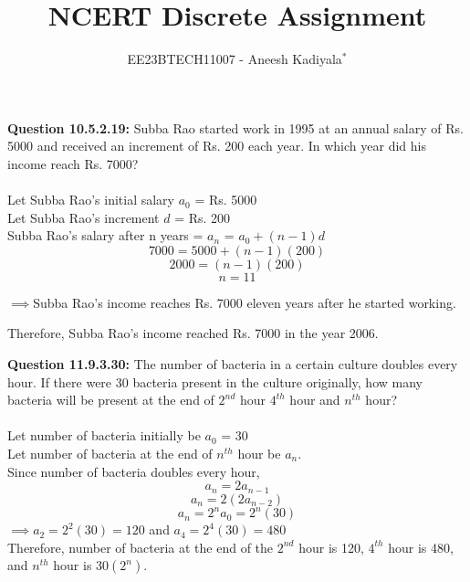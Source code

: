 \documentclass[journal,12pt,twocolumn]{IEEEtran}
\theoremstyle{remark}
\begin{document}

\vspace{3cm}

\title{NCERT Discrete Assignment}
\author{EE23BTECH11007 - Aneesh Kadiyala$^{*}$%
}
\maketitle
\newpage
\bigskip

\renewcommand{\thefigure}{\theenumi}
\renewcommand{\thetable}{\theenumi}

\vspace{3cm}
\textbf{Question 10.5.2.19:} Subba Rao started work in 1995 at an annual salary of Rs. 5000 and received an increment of Rs. 200 each year. In which year did his income reach Rs. 7000?
\\
\solution
\\
Let Subba Rao's initial salary $a_0$ = Rs. 5000
\\
Let Subba Rao's increment $d$ = Rs. 200
\\
Subba Rao's salary after n years = $a_n$ = $a_0 + (n - 1)d$
\\
\[7000 = 5000 + (n - 1)(200)\]
\[2000 = (n - 1)(200)\]
\[n = 11\]

$\implies$Subba Rao's income reaches Rs. 7000 eleven years after he started working.

Therefore, Subba Rao's income reached Rs. 7000 in the year 2006.

\vspace{1cm}
\textbf{Question 11.9.3.30:} The number of bacteria in a certain culture doubles every hour. If there were 30 bacteria present in the culture originally, how many bacteria will be present at the end of $2^{nd}$ hour $4^{th}$ hour and $n^{th}$ hour?
\\
\solution
\\
Let number of bacteria initially be $a_0$ = 30
\\
Let number of bacteria at the end of $n^{th}$ hour be $a_n$.
\\
Since number of bacteria doubles every hour, \[a_n = 2a_{n - 1}\]
\[a_n = 2(2a_{n - 2})\]
\[a_n = 2^na_0 = 2^n(30)\]
$\implies a_2 = 2^2(30) = 120$ and $a_4 = 2^4(30) = 480$
\\

Therefore, number of bacteria at the end of the $2^{nd}$ hour is 120, $4^{th}$ hour is 480, and $n^{th}$ hour is $30(2^n)$.
\end{document}
